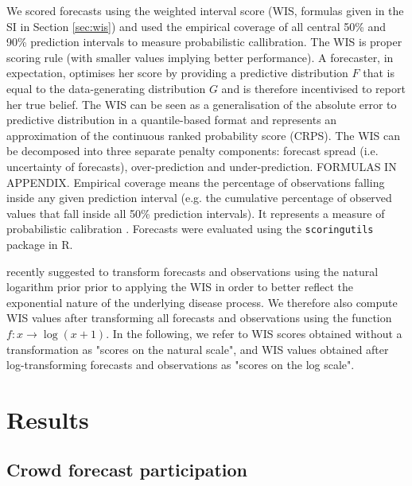 \documentclass[10pt,a4paper,twocolumn]{article}
\begin{document}
We scored forecasts using the weighted interval score (WIS, formulas given in the SI in Section \ref{sec:wis}) \cite{bracherEvaluatingEpidemicForecasts2021} and used the empirical coverage of all central 50\% and 90\% prediction intervals to measure probabilistic callibration. The WIS is proper scoring rule (with smaller values implying better performance). A forecaster, in expectation, optimises her score by providing a predictive distribution $F$ that is equal to the data-generating distribution $G$ and is therefore incentivised to report her true belief. The WIS can be seen as a generalisation of the absolute error to predictive distribution in a quantile-based format and represents an approximation of the continuous ranked probability score (CRPS). The WIS can be decomposed into three separate penalty components: forecast spread (i.e. uncertainty of forecasts), over-prediction and under-prediction. FORMULAS IN APPENDIX. Empirical coverage means the percentage of observations falling inside any given prediction interval (e.g. the cumulative percentage of observed values that fall inside all 50\% prediction intervals). It represents a measure of probabilistic calibration \citep{gneitingProbabilisticForecastsCalibration2007}. Forecasts were evaluated using the \texttt{scoringutils} \citep{bosseEvaluatingForecastsScoringutils2022} package in \textsf{R}.

\citet{bosseTransformationForecastsEvaluating2023} recently suggested to transform forecasts and observations using the natural logarithm prior prior to applying the WIS in order to better reflect the exponential nature of the underlying disease process. We therefore also compute WIS values after transforming all forecasts and observations using the function $f\colon x \to \log (x + 1)$. In the following, we refer to WIS scores obtained without a transformation as "scores on the natural scale", and WIS values obtained after log-transforming forecasts and observations as "scores on the log scale". 

\section*{Results}

\subsection*{Crowd forecast participation}
\end{document}
